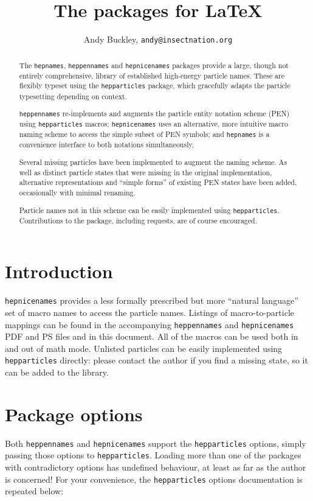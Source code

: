 \documentclass[12pt]{scrartcl}
\author{Andy Buckley, \texttt{andy@insectnation.org}}
\title{The \hepnames packages for \LaTeX}
\newcommand{\texpkg}[1]{\texttt{#1}}
\DeclareRobustCommand{\hepparticles}{\texpkg{hepparticles}\xspace}
\DeclareRobustCommand{\hepnames}{\texpkg{hepnames}\xspace}
\DeclareRobustCommand{\heppennames}{\texpkg{heppennames}\xspace}
\DeclareRobustCommand{\hepnicenames}{\texpkg{hepnicenames}\xspace}
\begin{document}
{\sf \maketitle}

\begin{abstract}
  The \hepnames, \heppennames and \hepnicenames packages provide a large, though
  not entirely comprehensive, library of established high-energy particle
  names. These are flexibly typeset using the \hepparticles package, which
  gracefully adapts the particle typesetting depending on context.

  \heppennames re-implements and augments the particle entity notation scheme
  (PEN) using \hepparticles macros; \hepnicenames uses an alternative, more
  intuitive macro naming scheme to access the simple subset of PEN symbols; and
  \hepnames is a convenience interface to both notations simultaneously.

  Several missing particles have been implemented to augment the naming
  scheme. As well as distinct particle states that were missing in the original
  implementation, alternative representations and ``simple forms'' of existing
  PEN states have been added, occasionally with minimal renaming.

  Particle names not in this scheme can be easily implemented using
  \hepparticles. Contributions to the package, including requests, are of course
  encouraged.
\end{abstract}


\section{Introduction}
\hepnicenames provides a less formally prescribed but more ``natural language''
set of macro names to access the particle names. Listings of macro-to-particle
mappings can be found in the accompanying \texttt{heppennames} and
\texttt{hepnicenames} PDF and PS files and in this document. All of the macros
can be used both in and out of math mode. Unlisted particles can be easily
implemented using \hepparticles directly: please contact the author if you find
a missing state, so it can be added to the library.


\section{Package options}
Both \heppennames and \hepnicenames support the \hepparticles options, simply 
passing those options to \hepparticles. Loading more than one of the packages 
with contradictory options has undefined behaviour, at least as far as the author 
is concerned! For your convenience, the \hepparticles options documentation is 
repeated below:
\end{document}
